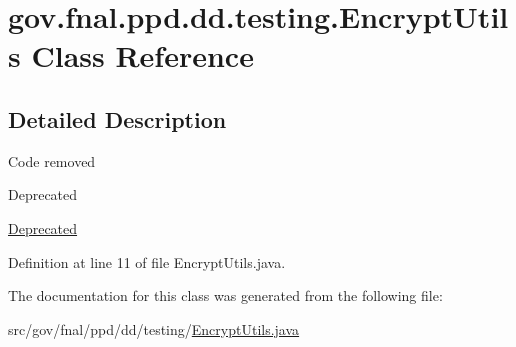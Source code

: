 \hypertarget{classgov_1_1fnal_1_1ppd_1_1dd_1_1testing_1_1EncryptUtils}{\section{gov.\-fnal.\-ppd.\-dd.\-testing.\-Encrypt\-Utils Class Reference}
\label{classgov_1_1fnal_1_1ppd_1_1dd_1_1testing_1_1EncryptUtils}
}


\subsection{Detailed Description}
Code removed \begin{DoxyRefDesc}{Deprecated}
\item[\hyperlink{deprecated__deprecated000006}{Deprecated}]\end{DoxyRefDesc}


Definition at line 11 of file Encrypt\-Utils.\-java.



The documentation for this class was generated from the following file\-:\begin{DoxyCompactItemize}
\item 
src/gov/fnal/ppd/dd/testing/\hyperlink{EncryptUtils_8java}{Encrypt\-Utils.\-java}\end{DoxyCompactItemize}

